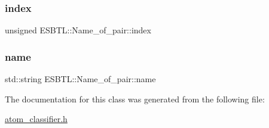 \subsubsection{\texorpdfstring{index}{index}}
{\footnotesize\ttfamily unsigned E\+S\+B\+T\+L\+::\+Name\+\_\+of\+\_\+pair\+::index}

\mbox{\label{classESBTL_1_1Name__of__pair_af11f24432e0ae4c9d1dfc7e2ad196083}} 
\subsubsection{\texorpdfstring{name}{name}}
{\footnotesize\ttfamily std\+::string E\+S\+B\+T\+L\+::\+Name\+\_\+of\+\_\+pair\+::name}



The documentation for this class was generated from the following file\+:\begin{DoxyCompactItemize}
\item 
\hyperlink{atom__classifier_8h}{atom\+\_\+classifier.\+h}\end{DoxyCompactItemize}
